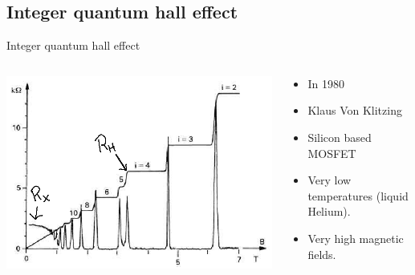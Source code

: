 \documentclass{beamer}
\begin{document}
\subsection{Integer quantum hall effect}

\begin{frame}{Integer quantum hall effect}
	\begin{columns}
		\begin{column}{0.7\textwidth}
			\begin{center}
				\includegraphics[width=\textwidth]{Images/IntegerQHE.png}
			\end{center}
		\end{column}
		\begin{column}{0.3\textwidth}
			\begin{itemize}
				\item In 1980
				\item Klaus Von Klitzing
				\item Silicon based MOSFET
				\item Very low temperatures (liquid Helium).
				\item Very high magnetic fields.
			\end{itemize}
		\end{column}
	\end{columns}
\end{frame}
\end{document}
